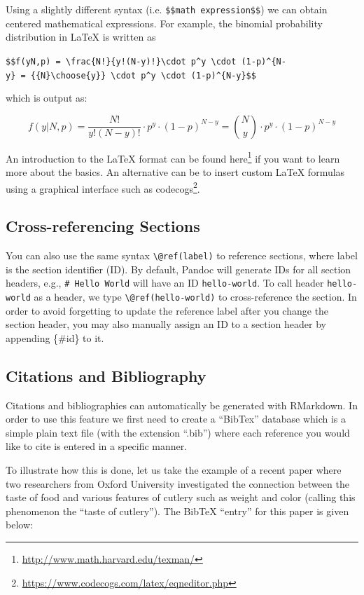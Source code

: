 \documentclass[12pt,]{krantz}
\renewcommand{\href}[2]{#2\footnote{\url{#1}}}
\begin{document}
Using a slightly different syntax (i.e.
\texttt{\$\$math\ expression\$\$}) we can obtain centered mathematical
expressions. For example, the binomial probability distribution in LaTeX
is written as

\texttt{\$\$f(y\textbar{}N,p)\ =\ \textbackslash{}frac\{N!\}\{y!(N-y)!\}\textbackslash{}cdot\ p\^{}y\ \textbackslash{}cdot\ (1-p)\^{}\{N-y\}\ =\ \{\{N\}\textbackslash{}choose\{y\}\}\ \textbackslash{}cdot\ p\^{}y\ \textbackslash{}cdot\ (1-p)\^{}\{N-y\}\$\$}

which is output as:

\[f(y|N,p) = \frac{N!}{y!(N-y)!}\cdot p^y \cdot (1-p)^{N-y} = {{N}\choose{y}} \cdot p^y \cdot (1-p)^{N-y}\]

An introduction to the LaTeX format can be found
\href{http://www.math.harvard.edu/texman/}{here} if you want to learn
more about the basics. An alternative can be to insert custom LaTeX
formulas using a graphical interface such as
\href{https://www.codecogs.com/latex/eqneditor.php}{codecogs}.

\subsection{Cross-referencing
Sections}\label{cross-referencing-sections}

You can also use the same syntax \texttt{\textbackslash{}@ref(label)} to
reference sections, where label is the section identifier (ID). By
default, Pandoc will generate IDs for all section headers, e.g.,
\texttt{\#\ Hello\ World} will have an ID \texttt{hello-world}. To call
header \texttt{hello-world} as a header, we type
\texttt{\textbackslash{}@ref(hello-world)} to cross-reference the
section. In order to avoid forgetting to update the reference label
after you change the section header, you may also manually assign an ID
to a section header by appending \{\#id\} to it.

\subsection{Citations and
Bibliography}\label{citations-and-bibliography}

Citations and bibliographies can automatically be generated with
RMarkdown. In order to use this feature we first need to create a
``BibTex'' database which is a simple plain text file (with the
extension ``.bib'') where each reference you would like to cite is
entered in a specific manner.

To illustrate how this is done, let us take the example of a recent
paper where two researchers from Oxford University investigated the
connection between the taste of food and various features of cutlery
such as weight and color (calling this phenomenon the ``taste of
cutlery''). The BibTeX ``entry'' for this paper is given below:
\end{document}
